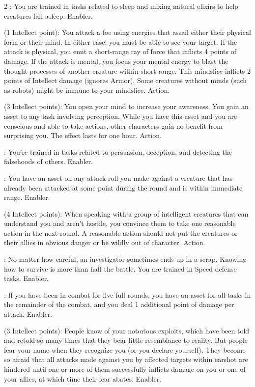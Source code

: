 \begin{multicols}{2}
: You are trained in tasks related to sleep and mixing natural elixirs to help creatures fall asleep. Enabler. 
 
 (1 Intellect point): You attack a foe using energies that assail either their physical form or their mind. In either case, you must be able to see your target. If the attack is physical, you emit a short-range ray of force that inflicts 4 points of damage. If the attack is mental, you focus your mental energy to blast the thought processes of another creature within short range. This mindslice inflicts 2 points of Intellect damage (ignores Armor). Some creatures without minds (such as robots) might be immune to your mindslice. Action. 
 
 (3 Intellect points): You open your mind to increase your awareness. You gain an asset to any task involving perception. While you have this asset and you are conscious and able to take actions, other characters gain no benefit from surprising you. The effect lasts for one hour. Action. 
 
: You’re trained in tasks related to persuasion, deception, and detecting the falsehoods of others. Enabler. 
 
: You have an asset on any attack roll you make against a creature that has already been attacked at some point during the round and is within immediate range. Enabler. 
 
 (4 Intellect points): When speaking with a group of intelligent creatures that can understand you and aren’t hostile, you convince them to take one reasonable action in the next round. A reasonable action should not put the creatures or their allies in obvious danger or be wildly out of character. Action. 
 
: No matter how careful, an investigator sometimes ends up in a scrap. Knowing how to survive is more than half the battle. You are trained in Speed defense tasks. Enabler. 

: If you have been in combat for five full rounds, you have an asset for all tasks in the remainder of the combat, and you deal 1 additional point of damage per attack. Enabler. 
 
 (3 Intellect points): People know of your notorious exploits, which have been told and retold so many times that they bear little resemblance to reality. But people fear your name when they recognize you (or you declare yourself). They become so afraid that all attacks made against you by affected targets within earshot are hindered until one or more of them successfully inflicts damage on you or one of your allies, at which time their fear abates. Enabler. 
 

\end{multicols}
